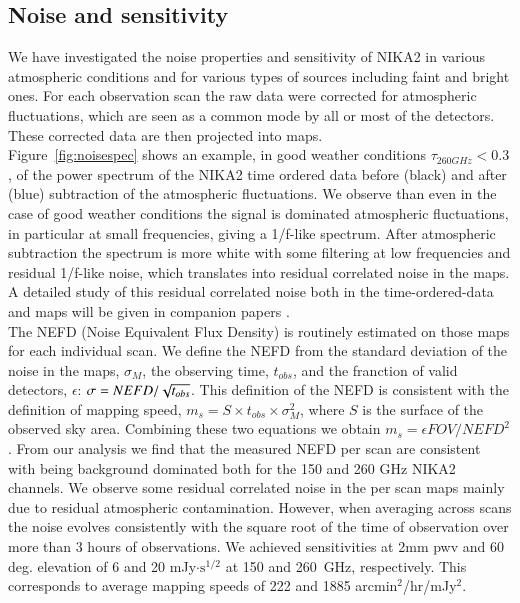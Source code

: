 \documentclass[]{aa} %
\begin{document}
\subsection{Noise and sensitivity}
\label{Noise and sensitivity}


We have investigated the noise properties and sensitivity of NIKA2 in various atmospheric conditions and for various types of sources including faint and bright ones. For each observation scan the raw data were corrected for atmospheric fluctuations, which are seen as a common mode by all or most of the detectors. These corrected data are then projected into maps.   \\

Figure~\ref{fig:noisespec} shows an example, in good weather conditions $\tau_{260 GHz} < 0.3$, of the power spectrum of the NIKA2 time ordered data before (black) and after (blue) subtraction of the atmospheric fluctuations.
We observe than even in the case of good weather conditions the signal is dominated atmospheric fluctuations, in particular at small frequencies, giving a 1/f-like spectrum. After atmospheric subtraction the spectrum is more white with some filtering at low frequencies and residual 1/f-like noise, which translates into residual correlated noise in the maps. A detailed study of this residual correlated noise both in the time-ordered-data and maps will be given in companion papers \cite{commissioning,pipeline}. \\

The NEFD (Noise Equivalent Flux Density) is routinely estimated on those maps for each individual scan. We define the NEFD from the standard deviation of the noise in the maps, $\sigma_{M}$, the observing time, $t_{obs}$, and the franction of valid detectors, $\epsilon$: $\sigma = NEFD / \sqrt{t_{obs} \time \epsilon}$. This definition of the NEFD is consistent with the definition of mapping speed, $m_{s} = S \times t_{obs} \times \sigma_{M}^{2}$, where $S$ is the surface of the observed sky area. Combining these two equations we obtain 
$m_{s} = \epsilon FOV / NEFD^2$.
From our analysis we find that the measured NEFD per scan are consistent with being background dominated both for the 150 and 260 GHz NIKA2 channels. We observe some residual correlated noise in the per scan maps mainly due to residual atmospheric contamination. However, when averaging across scans the noise evolves consistently with the square root of the time of observation over more than 3 hours of observations. We achieved sensitivities at 2mm pwv and 60 deg. elevation of 6 and 20 mJy$\cdot\textrm{s}^{1/2}$ at 150 and 260~GHz, respectively. This corresponds to average mapping speeds of 222 and 1885 arcmin$^2$/hr/mJy$^2$. 
\end{document}
